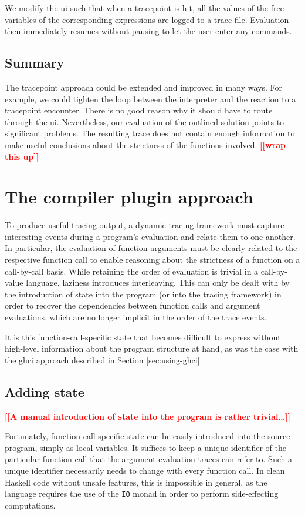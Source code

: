 \documentclass[thesis=B,english]{FITthesis}[2019/12/23]
\newcommand{\todo}[1]{\textcolor{red}{\textbf{[[#1]]}}}
\newcommand{\hsType}[1]{\texttt{#1}}
\begin{document}
We modify the \acrshort{ui} such that when a tracepoint is hit, all the values
of the free variables of the corresponding expressions are logged to a trace
file. Evaluation then immediately resumes without pausing to let the user enter
any commands.

\subsection*{Summary}
The tracepoint approach could be extended and improved in many ways. For
example, we could tighten the loop between the interpreter and the reaction to
a tracepoint encounter. There is no good reason why it should have to route
through the \acrshort{ui}. Nevertheless, our evaluation of the outlined
solution points to significant problems. The resulting trace does not contain
enough information to make useful conclusions about the strictness of the
functions involved. \todo{wrap this up}


\section{The compiler plugin approach}
To produce useful tracing output, a dynamic tracing framework must capture
interesting events during a program's evaluation and relate them to one
another. In particular, the evaluation of function arguments must be clearly
related to the respective function call to enable reasoning about the
strictness of a function on a call-by-call basis. While retaining the order of
evaluation is trivial in a call-by-value language, laziness introduces
interleaving. This can only be dealt with by the introduction of state into the
program (or into the tracing framework) in order to recover the dependencies
between function calls and argument evaluations, which are no longer implicit
in the order of the trace events.

It is this function-call-specific state that becomes difficult to express
without high-level information about the program structure at hand, as was the
case with the \acrshort{ghci} approach described in Section
\ref{sec:using-ghci}.

\subsection*{Adding state}
\todo{A manual introduction of state into the program is rather trivial\ldots}

Fortunately, function-call-specific state can be easily introduced into the
source program, simply as local variables. It suffices to keep a unique
identifier of the particular function call that the argument evaluation traces
can refer to. Such a unique identifier necessarily needs to change with every
function call. In clean Haskell code without unsafe features, this is
impossible in general, as the language requires the use of the \hsType{IO}
monad in order to perform side-effecting computations.
\end{document}
